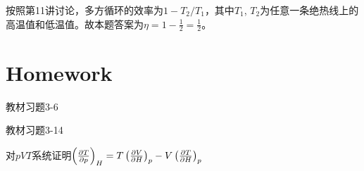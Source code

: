 \documentclass[CJK]{beamer}
\begin{document}
\begin{frame}
  \bch
  按照第11讲讨论，多方循环的效率为$1-T_2/T_1$，其中$T_1$, $T_2$为任意一条绝热线上的高温值和低温值。故本题答案为$\eta = 1 - \frac{1}{2} = \frac{1}{2}$。
  \ech
\end{frame}


\begin{frame}
  \bch
  
  \ech
\end{frame}

\begin{frame}
  \bch
  \ech
\end{frame}


\section{Homework}

\begin{frame}
  \bch
  {\small 
  \bitem
\item{教材习题3-6}
\item{教材习题3-14}
\item{对$pVT$系统证明$\left(\frac{\partial T}{\partial p}\right)_{H} = T \left(\frac{\partial V}{\partial H}\right)_{p} - V\left(\frac{\partial T}{\partial H}\right)_{p}$}
  \eitem
  }
  \ech
\end{frame}
\end{document}
